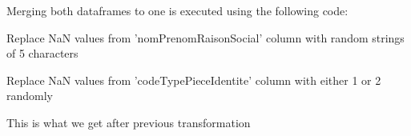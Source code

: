 Merging both dataframes to one is executed using the following code: 
\begin{figure}[H]
\centering
{}
\end{figure}
\begin{figure}[H]
\centering
{}
\end{figure}

Replace NaN values from 'nomPrenomRaisonSocial' column with random strings of 5 characters
\begin{figure}[H]
\centering
{}
\end{figure}

Replace NaN values from 'codeTypePieceIdentite' column with either 1 or 2 randomly
\begin{figure}[H]
\centering
{}
\end{figure}

This is what we get after previous transformation
\begin{figure}[H]
\centering
{}
\end{figure}

